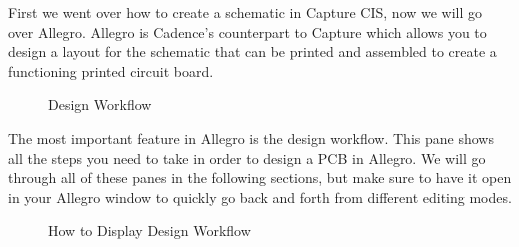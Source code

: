 First we went over how to create a schematic in Capture CIS, now we will go over Allegro. Allegro is
Cadence's counterpart to Capture which allows you to design a layout for the schematic that can be
printed and assembled to create a functioning printed circuit board.

\begin{figure}[H]
  \centering
\caption{Design Workflow}
\label{img:designworkflow}
\end{figure}

The most important feature in Allegro is the design workflow. This pane shows all the steps you need to take in order to design a PCB
in Allegro. We will go through all of these panes in the following sections, but make sure to have it open in your Allegro window to quickly
go back and forth from different editing modes.

\begin{figure}[H]
  \centering
\caption{How to Display Design Workflow}
\label{img:workflowTab}
\end{figure}

